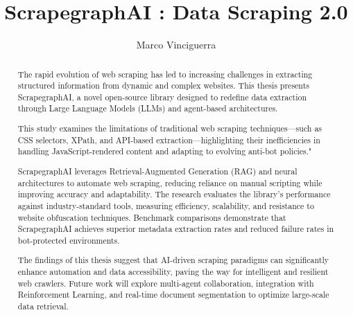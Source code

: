 \documentclass[english,master]{unibg}
\title{ScrapegraphAI : Data Scraping 2.0 }
\author{Marco Vinciguerra}
\begin{document}
\maketitle
\emptypage


\begin{abstract}
The rapid evolution of web scraping has led to increasing challenges in extracting structured information from dynamic and complex websites. This thesis presents ScrapegraphAI, a novel open-source library designed to redefine data extraction through Large Language Models (LLMs) and agent-based architectures. 

This study examines the limitations of traditional web scraping techniques—such as CSS selectors, XPath, and API-based extraction—highlighting their inefficiencies in handling JavaScript-rendered content and adapting to evolving anti-bot policies."

ScrapegraphAI leverages Retrieval-Augmented Generation (RAG) and neural architectures to automate web scraping, reducing reliance on manual scripting while improving accuracy and adaptability. The research evaluates the library's performance against industry-standard tools, measuring efficiency, scalability, and resistance to website obfuscation techniques. Benchmark comparisons demonstrate that ScrapegraphAI  achieves superior metadata extraction rates and reduced failure rates in bot-protected environments.

The findings of this thesis suggest that AI-driven scraping paradigms can significantly enhance automation and data accessibility, paving the way for intelligent and resilient web crawlers. Future work will explore multi-agent collaboration, integration with Reinforcement Learning, and real-time document segmentation to optimize large-scale data retrieval.
\end{abstract}

\emptypage
\toc
\emptypage

\clearpage
{}


\listoffigures
\listoftables


\end{document}
